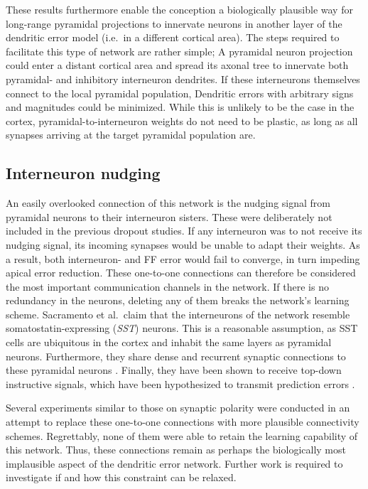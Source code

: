These results furthermore enable the conception a biologically plausible way for long-range pyramidal projections to
innervate neurons in another layer of the dendritic error model (i.e.\ in a different cortical area). The steps
required to facilitate this type of network are rather simple; A pyramidal neuron projection could enter a distant
cortical area and spread its axonal tree to innervate both pyramidal- and inhibitory interneuron dendrites. If these
interneurons themselves connect to the local pyramidal population, Dendritic errors with arbitrary signs and magnitudes
could be minimized. While this is unlikely to be the case in the cortex, pyramidal-to-interneuron weights do not need to
be plastic, as long as all synapses arriving at the target pyramidal population are.



\subsection{Interneuron nudging}

An easily overlooked connection of this network is the nudging signal from pyramidal neurons to their interneuron
sisters. These were deliberately not included in the previous dropout studies. If any interneuron was to not receive its
nudging signal, its incoming synapses would be unable to adapt their weights. As a result, both interneuron- and FF
error would fail to converge, in turn impeding apical error reduction. These one-to-one connections can  therefore be
considered the most important communication channels in the network. If there is no redundancy in the neurons, deleting
any of them breaks the network's learning scheme. Sacramento et al.\ claim that the interneurons of the network resemble
somatostatin-expressing (\textit{SST}) neurons. This is a reasonable assumption, as SST cells are ubiquitous in the
cortex and inhabit the same layers as pyramidal neurons. Furthermore, they share dense and recurrent synaptic
connections to these pyramidal neurons \citep{urban2016somatostatin}. Finally, they have been shown to receive top-down
instructive signals, which have been hypothesized to transmit prediction errors \citep{Leinweber2017}.

Several experiments similar to those on synaptic polarity were conducted in an attempt to replace these one-to-one
connections with more plausible connectivity schemes. Regrettably, none of them were able to retain the learning
capability of this network. Thus, these connections remain as perhaps the biologically most implausible aspect of the
dendritic error network. Further work is required to investigate if and how this constraint can be relaxed.



